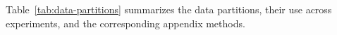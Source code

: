 
Table~\ref{tab:data-partitions} summarizes the data partitions,
their use across experiments, and the corresponding appendix methods.

\begingroup
{}\selectfont
\fontsize{7.5}{8.5}\selectfont
\hypersetup{hidelinks}
\setlength{\tabcolsep}{3pt}
\renewcommand{\arraystretch}{1.08}

\color{splitInk}

\newcommand{\splituse}[2]{%
  \cellcolor{split#1!8}\color{splitInk}#2}

\newcommand{\splitname}[2]{%
  \hypertarget{split:#1}{\textbf{#2}}}

